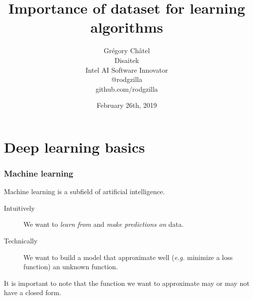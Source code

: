 \documentclass[10pt]{beamer}
\title{Importance of dataset for learning algorithms}
\author[G. Châtel]{Grégory Châtel\\\vspace{0.3cm}Disaitek\\Intel AI Software Innovator\\\vspace{0.3cm}@rodgzilla\\github.com/rodgzilla}
\date{February 26th, 2019}
\begin{document}
\begin{frame}

  \maketitle

\end{frame}

\begin{frame}

  \tableofcontents

\end{frame}

\section{Deep learning basics}

\begin{frame}

  \frametitle{Machine learning}

  Machine learning is a subfield of artificial intelligence.

  \bigskip

  \begin{description}
    \item[Intuitively] We want to \emph{learn from} and \emph{make predictions
    on} data.

    \item[Technically] We want to build a model that approximate well
      (\textit{e.g.} minimize a loss function) an unknown function.
  \end{description}

  \bigskip

  It is important to note that the function we want to approximate may
  or may not have a closed form.
\end{frame}
\end{document}
